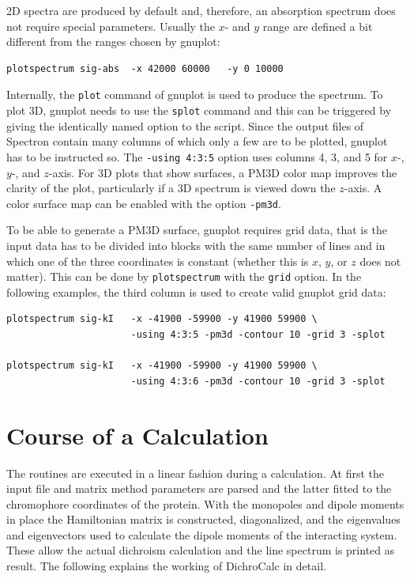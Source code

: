 \documentclass[11pt, letterpaper]{article}
\begin{document}
2D spectra are produced by default and, therefore, an absorption spectrum does not require special parameters. Usually the $x$- and $y$ range are defined a bit different from the ranges chosen by gnuplot:

\begin{verbatim}
plotspectrum sig-abs  -x 42000 60000   -y 0 10000 
\end{verbatim}

Internally, the \verb'plot' command of gnuplot is used to produce the spectrum. To plot 3D, gnuplot needs to use the \verb'splot' command and this can be triggered by giving the identically named option to the script. Since the output files of Spectron contain many columns of which only a few are to be plotted, gnuplot has to be instructed so. The \verb'-using 4:3:5' option uses columns 4, 3, and 5 for $x$-, $y$-, and $z$-axis. For 3D plots that show surfaces, a PM3D color map improves the clarity of the plot, particularly if a 3D spectrum is viewed down the $z$-axis. A color surface map can be enabled with the option \verb'-pm3d'.

To be able to generate a PM3D surface, gnuplot requires grid data, that is the input data has to be divided into blocks with the same number of lines and in which one of the three coordinates is constant (whether this is $x$, $y$, or $z$ does not matter). This can be done by \verb'plotspectrum' with the \verb'grid' option. In the following examples, the third column is used to create valid gnuplot grid data:

\begin{verbatim}
plotspectrum sig-kI   -x -41900 -59900 -y 41900 59900 \
                      -using 4:3:5 -pm3d -contour 10 -grid 3 -splot

plotspectrum sig-kI   -x -41900 -59900 -y 41900 59900 \
                      -using 4:3:6 -pm3d -contour 10 -grid 3 -splot
\end{verbatim}





\newpage

\section{Course of a Calculation}

The routines are executed in a linear fashion during a calculation. At first the input file and matrix method parameters are parsed and the latter fitted to the chromophore coordinates of the protein. With the monopoles and dipole moments in place the Hamiltonian matrix is constructed, diagonalized, and the eigenvalues and eigenvectors used to calculate the dipole moments of the interacting system. These allow the actual dichroism calculation and the line spectrum is printed as result. The following explains the working of DichroCalc in detail.
\end{document}
